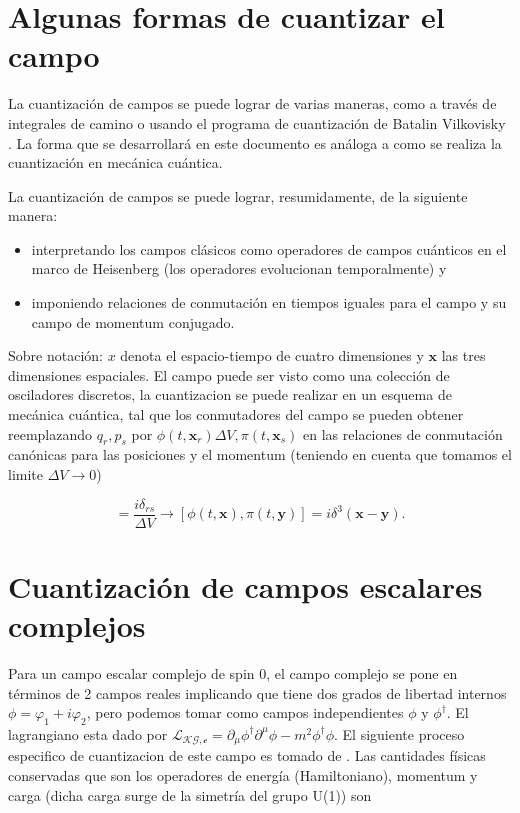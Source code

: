 \documentclass{article}
\begin{document}
\section{Algunas formas de cuantizar el campo}
La cuantización de campos se puede lograr de varias maneras, como a través de integrales de camino o usando el programa de cuantización de Batalin Vilkovisky \cite{Kaku:1993}. La forma que se desarrollará en este documento es análoga a como se realiza la cuantización en mecánica cuántica. 

La cuantización de campos se puede lograr, resumidamente, de la siguiente manera:
\begin{itemize}
\item interpretando los campos clásicos como operadores de campos cuánticos en el marco de Heisenberg (los operadores evolucionan temporalmente) y 
\item imponiendo relaciones de conmutación en tiempos iguales para el campo y su campo de momentum conjugado.
\end{itemize}
Sobre notación: $x$ denota el espacio-tiempo de cuatro dimensiones y $\mathbf{x}$ las tres dimensiones espaciales.
El campo puede ser visto como una colección de osciladores discretos, la cuantizacion se puede realizar en un esquema de mecánica cuántica, tal que los conmutadores del campo se pueden obtener reemplazando $q_r, p_s$ por $\phi(t,\mathbf{x}_r) \Delta V, \pi(t,\mathbf{x}_s)$ en las relaciones de conmutación canónicas para las posiciones y el momentum (teniendo en cuenta que tomamos el limite $\Delta V \rightarrow 0 $)

\begin{equation}
  [\phi(t,\mathbf{x}_r),\pi(t,\mathbf{x}_s)] = \frac{i \delta_{rs}}{\Delta V} \longrightarrow  [\phi(t,\mathbf{x}),\pi(t,\mathbf{y})] = i\delta^3(\mathbf{x}-\mathbf{y}).
\end{equation}

\section{Cuantización de campos escalares complejos}
Para un campo escalar complejo de spin $0$, el campo complejo se pone en términos de 2 campos reales implicando que tiene dos grados de libertad internos $\phi =\varphi_1 + i\varphi_2$, pero podemos tomar como campos independientes $\phi$ y  $\phi^\dagger$. El lagrangiano esta dado por $\mathscr{L_{KG,c}}=\partial_\mu \phi^\dagger \partial^\mu \phi - m^2 \phi^\dagger \phi$. El siguiente proceso especifico de cuantizacion de este campo es tomado de \cite{Nagashima:2010}.
Las cantidades físicas conservadas que son los operadores de energía (Hamiltoniano), momentum y carga (dicha carga surge de la simetría del grupo U(1)) son
\end{document}
